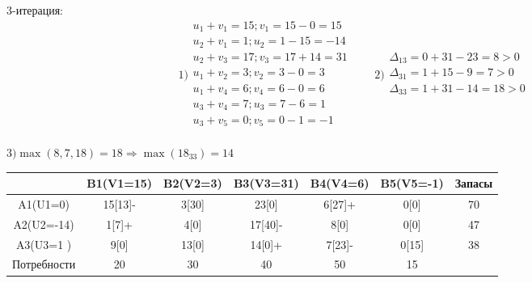 \documentclass[a4paper, 12pt]{article}
\begin{document}
3-итерация:\\
\begin{equation*}
  1)\begin{split}
    u_1 + v_1 = 15; v_1 = 15-0 = 15\\
    u_2 + v_1 = 1; u_2 = 1-15 = -14\\
    u_2 + v_3 = 17; v_3 = 17+14 = 31\\
    u_1 + v_2 = 3; v_2 = 3-0 = 3\\
    u_1 + v_4 = 6; v_4 = 6-0 = 6\\
    u_3 + v_4 = 7; u_3 = 7-6 = 1\\
    u_3 + v_5 = 0; v_5 = 0-1 = -1\\
  \end{split}
  \qquad  
  2)\begin{split}
    \Delta_{13} = 0+31-23= 8 > 0 \\
    \Delta_{31} = 1+15-9= 7 > 0 \\
    \Delta_{33} = 1+31-14= 18 > 0 \\
  \end{split}
\end{equation*}

\begin{math}
  3) \max(8,7,18)= 18 \Rightarrow \max(18_{33}) = 14
\end{math}
\begin{table}[H]
\centering
\begin{tabular}{|c|c|c|c|c|c|c|}
\hline
            & B1(V1=15)& B2(V2=3) & B3(V3=31) & B4(V4=6)  & B5(V5=-1) & Запасы \\ \hline
A1(U1=0)    & 15[13]-  & 3[30]    & 23[0]     & 6[27]+    & 0[0]      & 70     \\ \hline
A2(U2=-14)  & 1[7]+    & 4[0]     & 17[40]-   & 8[0]      & 0[0]      & 47     \\ \hline
A3(U3=1 )   & 9[0]     & 13[0]    & 14[0]+    & 7[23]-    & 0[15]     & 38     \\ \hline
Потребности & 20       & 30       & 40        & 50        & 15        &        \\ \hline
\end{tabular}
\end{table}
\end{document}
